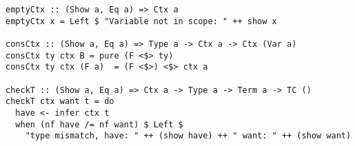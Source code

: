\begin{lstlisting}[caption={Проверка типов и контексты},captionpos=b]
emptyCtx :: (Show a, Eq a) => Ctx a
emptyCtx x = Left $ "Variable not in scope: " ++ show x

consCtx :: (Show a, Eq a) => Type a -> Ctx a -> Ctx (Var a)
consCtx ty ctx B = pure (F <$> ty)
consCtx ty ctx (F a)  = (F <$>) <$> ctx a

checkT :: (Show a, Eq a) => Ctx a -> Type a -> Term a -> TC ()
checkT ctx want t = do
  have <- infer ctx t
  when (nf have /= nf want) $ Left $
    "type mismatch, have: " ++ (show have) ++ " want: " ++ (show want)
\end{lstlisting}







